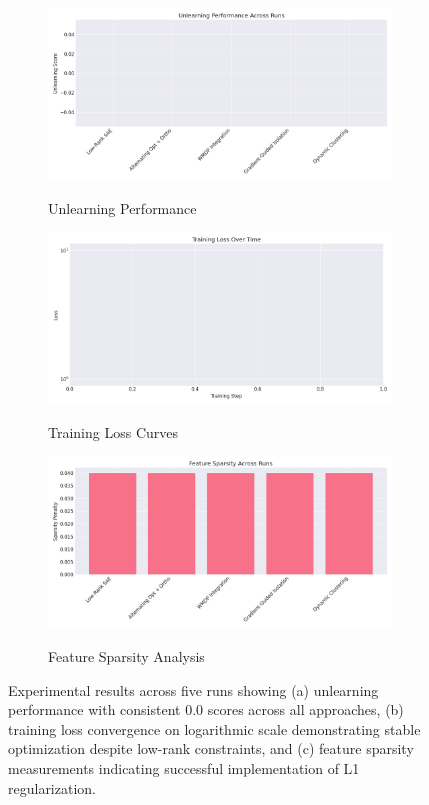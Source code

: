 \documentclass{article} %
\begin{document}
\begin{figure}[h]
    \centering
    \begin{subfigure}{0.32\textwidth}
        \includegraphics[width=\textwidth]{unlearning_scores.png}
        \label{fig:unlearning}
        \caption{Unlearning Performance}
    \end{subfigure}
    \hfill
    \begin{subfigure}{0.32\textwidth}
        \includegraphics[width=\textwidth]{training_loss.png}
        \label{fig:training}
        \caption{Training Loss Curves}
    \end{subfigure}
    \hfill
    \begin{subfigure}{0.32\textwidth}
        \includegraphics[width=\textwidth]{feature_sparsity.png}
        \label{fig:sparsity}
        \caption{Feature Sparsity Analysis}
    \end{subfigure}
    \caption{Experimental results across five runs showing (a) unlearning performance with consistent 0.0 scores across all approaches, (b) training loss convergence on logarithmic scale demonstrating stable optimization despite low-rank constraints, and (c) feature sparsity measurements indicating successful implementation of L1 regularization.}
    \label{fig:first_figure}
\end{figure}
\end{document}
